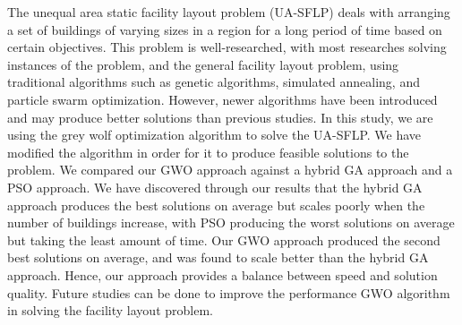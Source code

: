 
The unequal area static facility layout problem (UA-SFLP) deals with arranging a set of buildings of varying sizes in a region for a long period of time based on certain objectives. This problem is well-researched, with most researches solving instances of the problem, and the general facility layout problem, using traditional algorithms such as genetic algorithms, simulated annealing, and particle swarm optimization. However, newer algorithms have been introduced and may produce better solutions than previous studies. In this study, we are using the grey wolf optimization algorithm to solve the UA-SFLP. We have modified the algorithm in order for it to produce feasible solutions to the problem. We compared our GWO approach against a hybrid GA approach and a PSO approach. We have discovered through our results that the hybrid GA approach produces the best solutions on average but scales poorly when the number of buildings increase, with PSO producing the worst solutions on average but taking the least amount of time. Our GWO approach produced the second best solutions on average, and was found to scale better than the hybrid GA approach. Hence, our approach provides a balance between speed and solution quality. Future studies can be done to improve the performance GWO algorithm in solving the facility layout problem.